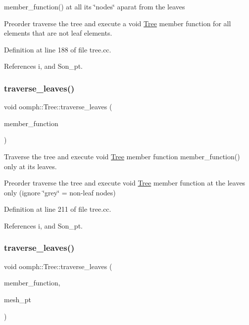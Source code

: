 member\+\_\+function() at all its \char`\"{}nodes\char`\"{} aparat from the leaves

Preorder traverse the tree and execute a void \hyperlink{classoomph_1_1Tree}{Tree} member function for all elements that are not leaf elements. 

Definition at line 188 of file tree.\+cc.



References i, and Son\+\_\+pt.

\mbox{\label{classoomph_1_1Tree_a22e0e3695dd8986e439927b7657ff741}} 
\subsubsection{\texorpdfstring{traverse\+\_\+leaves()}{traverse\_leaves()}\hspace{0.1cm}{\footnotesize\ttfamily [1/2]}}
{\footnotesize\ttfamily void oomph\+::\+Tree\+::traverse\+\_\+leaves (\begin{DoxyParamCaption}\item[{\hyperlink{classoomph_1_1Tree_af04461175b6345658a215ecf039eb69e}{Tree\+::\+Void\+Member\+Fct\+Pt}}]{member\+\_\+function }\end{DoxyParamCaption})}



Traverse the tree and execute void \hyperlink{classoomph_1_1Tree}{Tree} member function member\+\_\+function() only at its leaves. 

Preorder traverse the tree and execute void \hyperlink{classoomph_1_1Tree}{Tree} member function at the leaves only (ignore \char`\"{}grey\char`\"{} = non-\/leaf nodes) 

Definition at line 211 of file tree.\+cc.



References i, and Son\+\_\+pt.

\mbox{\label{classoomph_1_1Tree_a914e74ef473b7e82299ea9337d37830d}} 
\subsubsection{\texorpdfstring{traverse\+\_\+leaves()}{traverse\_leaves()}\hspace{0.1cm}{\footnotesize\ttfamily [2/2]}}
{\footnotesize\ttfamily void oomph\+::\+Tree\+::traverse\+\_\+leaves (\begin{DoxyParamCaption}\item[{\hyperlink{classoomph_1_1Tree_a3e690483c4f28d0a34b24b6ef7eba7f0}{Tree\+::\+Void\+Mesh\+Pt\+Argument\+Member\+Fct\+Pt}}]{member\+\_\+function,  }\item[{\hyperlink{classoomph_1_1Mesh}{Mesh} $\ast$\&}]{mesh\+\_\+pt }\end{DoxyParamCaption})}



